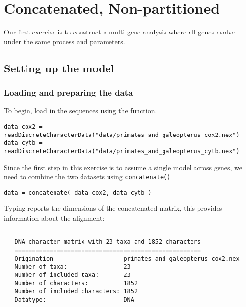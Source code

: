\section{Concatenated, Non-partitioned}\label{sec:unif} 

Our first exercise is to construct a multi-gene analysis where all genes evolve under the same process and parameters.

\subsection{Setting up the model}

\subsubsection{Loading and preparing the data}

To begin, load in the sequences using the  function. 
{\tt \begin{snugshade*}
\begin{lstlisting}
data_cox2 = readDiscreteCharacterData("data/primates_and_galeopterus_cox2.nex")
data_cytb = readDiscreteCharacterData("data/primates_and_galeopterus_cytb.nex")
\end{lstlisting}
\end{snugshade*}}

Since the first step in this exercise is to assume a single model across genes, we need to combine the two datasets using {\tt concatenate()}

{\tt \begin{snugshade*}
\begin{lstlisting}
data = concatenate( data_cox2, data_cytb )
\end{lstlisting}
\end{snugshade*}}

Typing  reports the dimensions of the concatenated matrix, this provides information about the alignment:


{\tt \begin{snugshade*}
\begin{lstlisting}

   DNA character matrix with 23 taxa and 1852 characters
   =====================================================
   Origination:                   primates_and_galeopterus_cox2.nex
   Number of taxa:                23
   Number of included taxa:       23
   Number of characters:          1852
   Number of included characters: 1852
   Datatype:                      DNA

\end{lstlisting}
\end{snugshade*}}

